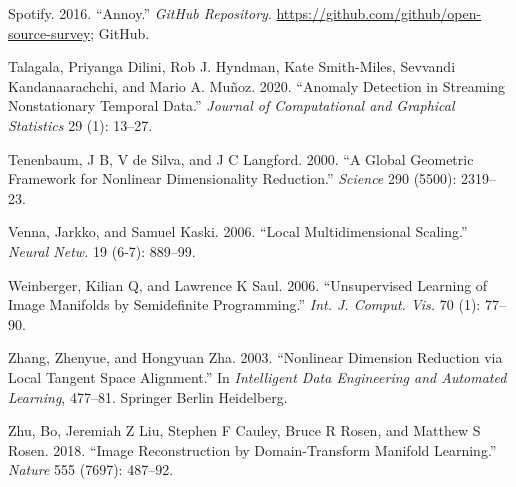 \documentclass[12pt]{article}
\newlength{\cslhangindent}
\newenvironment{cslreferences}%
  {\setlength{\parindent}{0pt}%
  \everypar{\setlength{\hangindent}{\cslhangindent}}\ignorespaces}%
  {\par}
\begin{document}
\begin{cslreferences}
\leavevmode\hypertarget{ref-Bernhardsson2016-tf}{}%
Spotify. 2016. ``Annoy.'' \emph{GitHub Repository}. \url{https://github.com/github/open-source-survey}; GitHub.

\leavevmode\hypertarget{ref-Talagala2020}{}%
Talagala, Priyanga Dilini, Rob J. Hyndman, Kate Smith-Miles, Sevvandi Kandanaarachchi, and Mario A. Muñoz. 2020. ``Anomaly Detection in Streaming Nonstationary Temporal Data.'' \emph{Journal of Computational and Graphical Statistics} 29 (1): 13--27.

\leavevmode\hypertarget{ref-Tenenbaum2000-fr}{}%
Tenenbaum, J B, V de Silva, and J C Langford. 2000. ``A Global Geometric Framework for Nonlinear Dimensionality Reduction.'' \emph{Science} 290 (5500): 2319--23.

\leavevmode\hypertarget{ref-Venna2006-nd}{}%
Venna, Jarkko, and Samuel Kaski. 2006. ``Local Multidimensional Scaling.'' \emph{Neural Netw.} 19 (6-7): 889--99.

\leavevmode\hypertarget{ref-Weinberger2006-dc}{}%
Weinberger, Kilian Q, and Lawrence K Saul. 2006. ``Unsupervised Learning of Image Manifolds by Semidefinite Programming.'' \emph{Int. J. Comput. Vis.} 70 (1): 77--90.

\leavevmode\hypertarget{ref-Zhang2003-yi}{}%
Zhang, Zhenyue, and Hongyuan Zha. 2003. ``Nonlinear Dimension Reduction via Local Tangent Space Alignment.'' In \emph{Intelligent Data Engineering and Automated Learning}, 477--81. Springer Berlin Heidelberg.

\leavevmode\hypertarget{ref-Zhu2018-jw}{}%
Zhu, Bo, Jeremiah Z Liu, Stephen F Cauley, Bruce R Rosen, and Matthew S Rosen. 2018. ``Image Reconstruction by Domain-Transform Manifold Learning.'' \emph{Nature} 555 (7697): 487--92.
\end{cslreferences}





\end{document}
